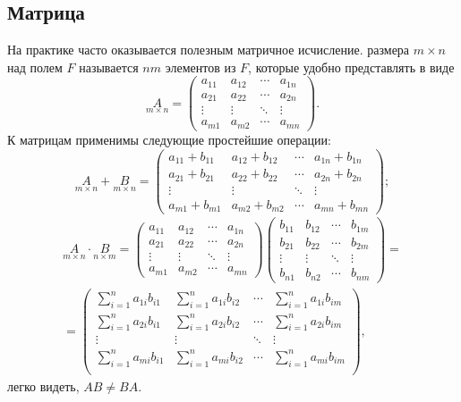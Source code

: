 \subsection{Матрица}
На практике часто оказывается полезным матричное исчисление.  размера $m \times n$ над полем $F$ называется $nm$ элементов из $F$, которые удобно представлять в виде 
	\begin{equation}
		\underset{m \times n}{A} = 
		\begin{pmatrix}
			a_{11} & a_{12} & \cdots & a_{1n}\\
			a_{21} & a_{22} & \cdots & a_{2n}\\
			\vdots & \vdots & \ddots & \vdots\\
			a_{m1} & a_{m2} & \cdots & a_{mn}
		\end{pmatrix}.
	\end{equation}
	К матрицам применимы следующие простейшие операции:
	\begin{equation}
	\underset{m \times n}{A} + \underset{m \times n}{B} = 
	\begin{pmatrix}
		a_{11} + b_{11} & a_{12} + b_{12} & \cdots & a_{1n} +  b_{1n}\\
		a_{21} + b_{21} & a_{22} + b_{22}& \cdots & a_{2n} + b_{2n}\\
		\vdots & \vdots & \ddots & \vdots\\
		a_{m1} + b_{m1} & a_{m2} + b_{m2} & \cdots & a_{mn} +  b_{mn}
	\end{pmatrix};
	\end{equation}
	\begin{multline}
		\underset{m \times n}{A} \cdot \underset{n \times m}{B} = 
		\begin{pmatrix}
			a_{11} & a_{12} & \cdots & a_{1n}\\
			a_{21} & a_{22} & \cdots & a_{2n}\\
			\vdots & \vdots & \ddots & \vdots\\
			a_{m1} & a_{m2} & \cdots & a_{mn}
		\end{pmatrix}
		\begin{pmatrix}
			b_{11} & b_{12} & \cdots & b_{1m}\\
			b_{21} & b_{22} & \cdots & b_{2m}\\
			\vdots & \vdots & \ddots & \vdots\\
			b_{n1} & b_{n2} & \cdots & b_{nm}
		\end{pmatrix} = \\
		= \begin{pmatrix}
			\sum\limits_{i=1}^{n} a_{1i} b_{i1} & \sum\limits_{i=1}^{n} a_{1i} b_{i2} & \cdots & \sum\limits_{i=1}^{n} a_{1i} b_{im}\\
			\sum\limits_{i=1}^{n} a_{2i} b_{i1} & \sum\limits_{i=1}^{n} a_{2i} b_{i2} & \cdots & \sum\limits_{i=1}^{n} a_{2i} b_{im}\\
			\vdots & \vdots & \ddots & \vdots\\
			\sum\limits_{i=1}^{n} a_{mi} b_{i1} & \sum\limits_{i=1}^{n} a_{mi} b_{i2} & \cdots & \sum\limits_{i=1}^{n} a_{m	i} b_{im}\\
		\end{pmatrix},
	\end{multline}
	легко видеть, $A B \not = B A$.
	
